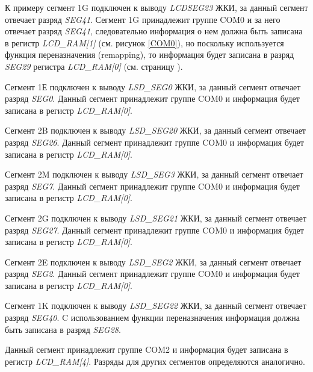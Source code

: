 \begin{table}[H]
\begin{center}
\begin{tabular}{|c|c|c|c|c|c|c|c|}
\end{tabular}
\end{center}
\end{table}


К примеру сегмент 1G подключен к выводу \textit{LCDSEG23} ЖКИ, за данный сегмент отвечает разряд \textit{SEG41}. Сегмент 1G принадлежит группе COM0 и за него отвечает разряд \textit{SEG41}, следовательно информация о нем должна быть записана в регистр \textit{LCD\_RAM[1]} (см. рисунок \ref{COM0}), но поскольку используется функция переназначения (remapping), то информация будет записана в разряд \textit{SEG29} регистра \textit{LCD\_RAM[0]} (см. страницу \pageref{RegMemLCD}). 

Сегмент 1Е подключен к выводу \textit{LSD\_SEG0} ЖКИ, за данный сегмент отвечает разряд \textit{SEG0}. Данный сегмент принадлежит группе COM0 и информация будет записана в регистр \textit{LCD\_RAM[0]}.

Сегмент 2B подключен к выводу \textit{LSD\_SEG20} ЖКИ, за данный сегмент отвечает разряд \textit{SEG26}. Данный сегмент принадлежит группе COM0 и информация будет записана в регистр \textit{LCD\_RAM[0]}.

Сегмент 2M подключен к выводу \textit{LSD\_SEG3} ЖКИ, за данный сегмент отвечает разряд \textit{SEG7}. Данный сегмент принадлежит группе COM0 и информация будет записана в регистр \textit{LCD\_RAM[0]}.

Сегмент 2G подключен к выводу \textit{LSD\_SEG21} ЖКИ, за данный сегмент отвечает разряд \textit{SEG27}. Данный сегмент принадлежит группе COM0 и информация будет записана в регистр \textit{LCD\_RAM[0]}.

Сегмент 2E подключен к выводу \textit{LSD\_SEG2} ЖКИ, за данный сегмент отвечает разряд \textit{SEG2}. Данный сегмент принадлежит группе COM0 и информация будет записана в регистр \textit{LCD\_RAM[0]}. 

Сегмент 1K подключен к выводу \textit{LSD\_SEG22} ЖКИ, за данный сегмент отвечает разряд \textit{SEG40}. C использованием функции переназначения информация должна быть записана в разряд \textit{SEG28}. 

Данный сегмент принадлежит группе COM2 и информация будет записана в регистр \textit{LCD\_RAM[4]}. 
Разряды для других сегментов определяются аналогично.

